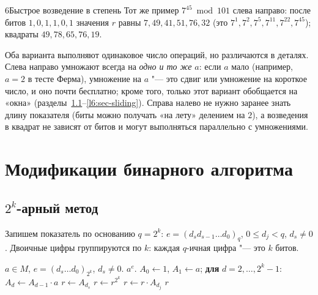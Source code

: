 \begin{lecture}{6}{Быстрое возведение в степень}
Тот же пример $7^{45} \bmod 101$ слева направо: после битов $1, 0, 1, 1, 0, 1$ значения $r$ равны
$7, 49, 41, 51, 76, 32$ (это $7^{1}, 7^{2}, 7^{5}, 7^{11}, 7^{22}, 7^{45}$); квадраты
$49, 78, 65, 76, 19$.


\begin{remark}
Оба варианта выполняют одинаковое число операций, но различаются в деталях.
Слева направо умножают всегда на \emph{одно и то же} $a$: если $a$ мало (например, $a = 2$ в тесте
Ферма), умножение на $a$ "--- это сдвиг или умножение на короткое число, и оно почти бесплатно; кроме
того, только этот вариант обобщается на «окна» (разделы~\ref{l6:sec-qary}--\ref{l6:sec-sliding}).
Справа налево не нужно заранее знать длину показателя (биты можно получать «на лету»
делением на $2$), а возведения в квадрат не зависят от битов и могут выполняться параллельно
с умножениями.
\end{remark}



\section{Модификации бинарного алгоритма}

\subsection{$2^k$-арный метод}\label{l6:sec-qary}

Запишем показатель по основанию $q = 2^k$: $e = (d_{s} d_{s-1} \dots d_0)_q$, $0 \le d_j < q$,
$d_s \ne 0$. Двоичные цифры группируются по $k$: каждая $q$-ичная цифра "--- это $k$ битов.

\begin{algorithm}\label{l6:qary}
\begin{algorithmic}[1]
\Require $a \in M$, $e = (d_s \dots d_0)_{2^k}$, $d_s \ne 0$.
\Ensure $a^e$.
\State $A_0 \gets 1$, $A_1 \gets a$; \textbf{для} $d = 2, \dots, 2^k - 1$: $A_d \gets A_{d-1} \cdot a$
\State $r \gets A_{d_s}$
  \State $r \gets r^{2^k}$ 
   $r \gets r \cdot A_{d_j}$ \EndIf
\EndFor
\State \Return $r$
\end{algorithmic}
\end{algorithm}


\end{lecture}

